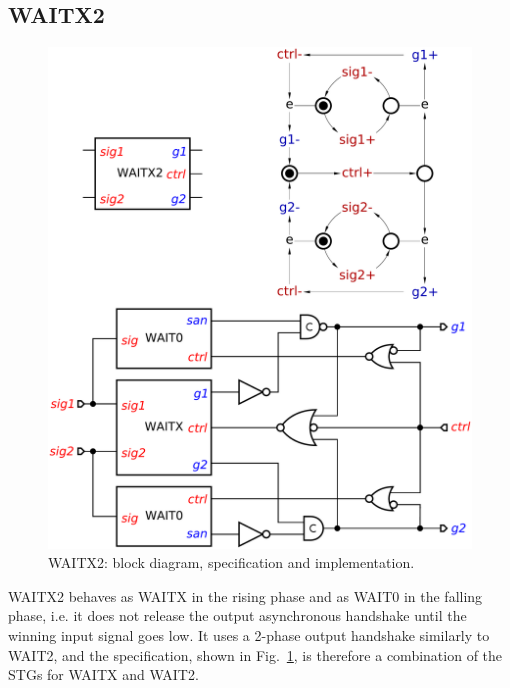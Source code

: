 \documentclass[conference]{IEEEtran}
\begin{document}
\subsection*{\textsf{WAITX2}}

\begin{figure}
\begin{center}
    \vspace{-2mm}
    \includegraphics[scale=0.23]{fig/WAITX2.pdf}
    \caption{\textsf{WAITX2}: block diagram, specification and implementation.}
    \label{fig:waitx2}
    \vspace{-5mm}
\end{center}
\end{figure}

\textsf{WAITX2} behaves as \textsf{WAITX} in the rising phase and as \textsf{WAIT0}
in the falling phase, i.e. it does not release the output asynchronous handshake until
the winning input signal goes low. It uses a 2-phase output handshake similarly to
\textsf{WAIT2}, and the specification, shown in Fig.~\ref{fig:waitx2}, is therefore
a combination of the STGs for \textsf{WAITX} and \textsf{WAIT2}.
\end{document}
